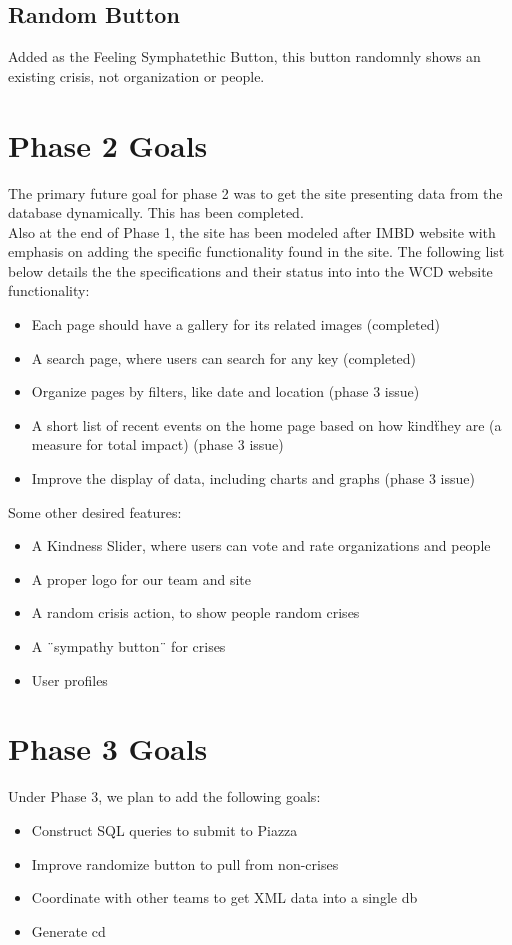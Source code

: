 \documentclass[12pt]{report}
\begin{document}
\subsection*{Random Button}
\hfill 

Added as the Feeling Symphatethic Button, this button randomnly shows an existing crisis, not organization or people. 

\newpage
\section*{Phase 2 Goals}
\hfill


The primary future goal for phase 2 was to get the site presenting data from the database dynamically. This has been completed.\\ 


Also at the end of Phase 1, the site has been modeled after IMBD website with emphasis on adding the specific functionality found in the site. The following list below details the the specifications and their status into into the WCD website functionality:
\begin{itemize}
\item Each page should have a gallery for its related images (completed)
\item A search page, where users can search for any key (completed)
\item Organize pages by filters, like date and location (phase 3 issue)
\item A short list of recent events on the home page based on how \"kind\" they are (a measure for total impact) (phase 3 issue)
\item Improve the display of data, including charts and graphs (phase 3 issue)
\end{itemize}

\hfill \newline
Some other desired features:
\begin{itemize}
\item A Kindness Slider, where users can vote and rate organizations and people
\item A proper logo for our team and site
\item A random crisis action, to show people random crises
\item A ¨sympathy button¨ for crises
\item User profiles
\end{itemize}


\newpage
\section*{Phase 3 Goals}
\hfill

Under Phase 3, we plan to add the following goals:
\begin{itemize}
\item Construct SQL queries to submit to Piazza
\item Improve randomize button to pull from non-crises
\item Coordinate with other teams to get XML data into a single db
\item Generate cd 
\end{itemize}
\end{document}
